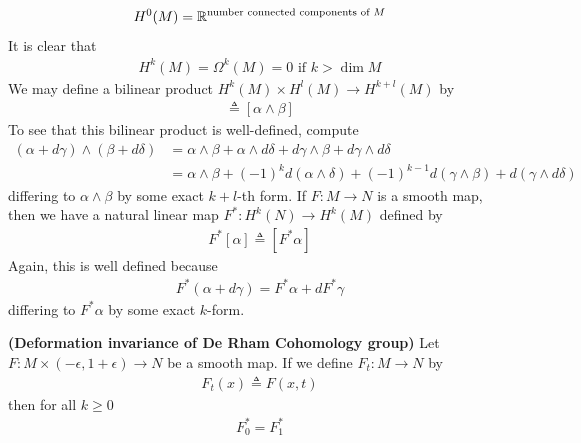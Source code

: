 \documentclass{report}
\begin{document}
\begin{mdframed}
\begin{align*}
H^0(M)=\mathbb{R}^{\text{number  connected components of }M}
\end{align*}
It is clear that 
\begin{align*}
H^k(M)=\Omega^k(M)=0\text{ if }k>\operatorname{dim}M
\end{align*}
We may define a bilinear product $H^k(M)\times H^l(M)\to H^{k+l}(M)$ by 
\begin{align*}
[\alpha ][\beta ]\triangleq  [\alpha \wedge  \beta ]
\end{align*}
To see that this bilinear product is well-defined, compute 
\begin{align*}
  (\alpha + d\gamma )\wedge  (\beta  + d\delta)&= \alpha \wedge  \beta + \alpha \wedge  d \delta + d\gamma  \wedge  \beta  + d\gamma   \wedge  d\delta     \\
  &= \alpha \wedge  \beta  + (-1)^kd(\alpha \wedge  \delta )  + (-1)^{k-1}d (\gamma \wedge  \beta  )+d(\gamma  \wedge  d \delta )
\end{align*}
differing to $\alpha \wedge  \beta $ by some exact $k+l$-th form. If $F:M\rightarrow N$ is a smooth map, then we have a natural linear map $F^*:H^k(N)\rightarrow H^k(M)$ defined by 
\begin{align*}
F^* [\alpha ]\triangleq [F^* \alpha ]
\end{align*}
Again, this is well defined because 
\begin{align*}
F^*(\alpha +d \gamma )= F^* \alpha +d F^* \gamma  
\end{align*}
differing to $F^*\alpha $ by some exact $k$-form. 
\end{mdframed}
\begin{theorem}
\label{PPL}
\textbf{(Deformation invariance of De Rham Cohomology group)} Let $F:M\times  (-\epsilon  ,1+\epsilon )\rightarrow N$ be a smooth map. If we define $F_t:M\rightarrow N$ by 
\begin{align*}
F_t(x)\triangleq F(x,t)
\end{align*}
then for all $k\geq 0$
\begin{align*}
F_0^*=F_1^*
\end{align*}
\end{theorem}
\end{document}
